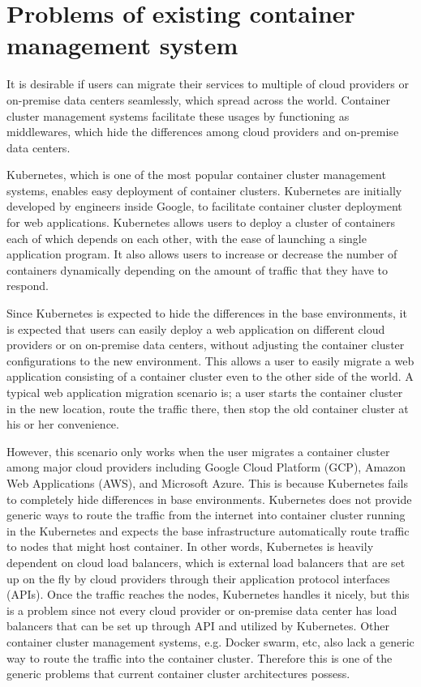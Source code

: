 \section{Problems of existing container management system}

It is desirable if users can migrate their services to multiple of cloud providers or on-premise data centers seamlessly, which spread across the world.
Container cluster management systems facilitate these usages by functioning as middlewares, which hide the differences among cloud providers and on-premise data centers.

Kubernetes\cite{K8s2017}, which is one of the most popular container cluster management systems, enables easy deployment of container clusters.
Kubernetes are initially developed by engineers inside Google, to facilitate container cluster deployment for web applications.
Kubernetes allows users to deploy a cluster of containers each of which depends on each other, with the ease of launching a single application program.
It also allows users to increase or decrease the number of containers dynamically depending on the amount of traffic that they have to respond.

Since Kubernetes is expected to hide the differences in the base environments, it is expected that users can easily deploy a web application on different cloud providers or on on-premise data centers, without adjusting the container cluster configurations to the new environment. 
This allows a user to easily migrate a web application consisting of a container cluster even to the other side of the world.
A typical web application migration scenario is; 
a user starts the container cluster in the new location, route the traffic there, then stop the old container cluster at his or her convenience.

However, this scenario only works when the user migrates a container cluster among major cloud providers including Google Cloud Platform (GCP), Amazon Web Applications (AWS), and Microsoft Azure.
This is because Kubernetes fails to completely hide differences in base environments.
Kubernetes does not provide generic ways to route the traffic from the internet into container cluster running in the Kubernetes and expects the base infrastructure automatically route traffic to nodes that might host container.
In other words, Kubernetes is heavily dependent on cloud load balancers, which is external load balancers that are set up on the fly by cloud providers through their application protocol interfaces (APIs).
Once the traffic reaches the nodes, Kubernetes handles it nicely, but this is a problem since not every cloud provider or on-premise data center has load balancers that can be set up through API and utilized by Kubernetes.
Other container cluster management systems, e.g. Docker swarm, etc, also lack a generic way to route the traffic into the container cluster.
Therefore this is one of the generic problems that current container cluster architectures possess.

